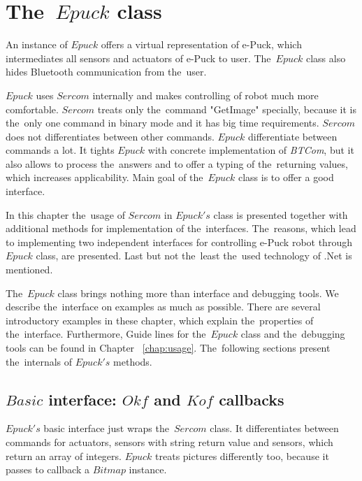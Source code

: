 \section{The~$Epuck$ class} \label{sec:epuck}
  An instance of $Epuck$ offers a virtual representation of e-Puck,
  which intermediates all sensors and actuators of e-Puck to user. 
  The~$Epuck$ class also hides Bluetooth communication from the~user.

  $Epuck$ uses $Sercom$ internally and makes controlling of robot much more comfortable.
  $Sercom$ treats only the~command "GetImage" specially, because it is the~only one command in binary mode
  and it has big time requirements. $Sercom$ does not differentiates between other commands.
  $Epuck$ differentiate between commands a lot. It tights $Epuck$ with concrete implementation of {\it BTCom},
  but it also allows to process the~answers and to offer a typing of the~returning values, which increases
  applicability. Main goal of the~$Epuck$ class is to offer a good interface.

  In this chapter the~usage of $Sercom$ in $Epuck's$ class is presented together with additional methods 
  for implementation of the~interfaces. The~reasons, which lead to implementing two independent interfaces for
  controlling e-Puck robot through $Epuck$ class, are presented.
  Last but not the~least the~used technology of .Net is mentioned.

  The~$Epuck$ class brings nothing more than interface and debugging tools. We describe the~interface
  on examples as much as possible. There are several introductory examples in these chapter,
  which explain the~properties of the~interface. Furthermore, 
  Guide lines for the~$Epuck$ class and the~debugging
  tools can be found in Chapter ~\ref{chap:usage}.
  The~following sections present the~internals of $Epuck's$ methods.
  
\subsection{$Basic$ interface: $Okf$ and $Kof$ callbacks} \label{sec:okfkofi}
  $Epuck's$ basic interface just wraps the~$Sercom$ class. It differentiates between
  commands for actuators, sensors with string return value and sensors, which return an array of integers.
  $Epuck$ treats pictures differently too, because it passes to callback a $Bitmap$ instance.


